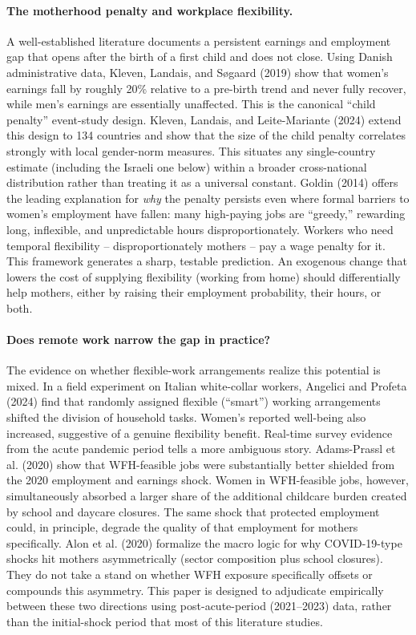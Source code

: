 \documentclass[11pt]{article}
\begin{document}
\paragraph{The motherhood penalty and workplace flexibility.} A well-established literature documents a persistent earnings and employment gap that opens after the birth of a first child and does not close. Using Danish administrative data, Kleven, Landais, and Søgaard (2019) show that women's earnings fall by roughly 20\% relative to a pre-birth trend and never fully recover, while men's earnings are essentially unaffected. This is the canonical ``child penalty'' event-study design. Kleven, Landais, and Leite-Mariante (2024) extend this design to 134 countries and show that the size of the child penalty correlates strongly with local gender-norm measures. This situates any single-country estimate (including the Israeli one below) within a broader cross-national distribution rather than treating it as a universal constant. Goldin (2014) offers the leading explanation for \emph{why} the penalty persists even where formal barriers to women's employment have fallen: many high-paying jobs are ``greedy,'' rewarding long, inflexible, and unpredictable hours disproportionately. Workers who need temporal flexibility -- disproportionately mothers -- pay a wage penalty for it. This framework generates a sharp, testable prediction. An exogenous change that lowers the cost of supplying flexibility (working from home) should differentially help mothers, either by raising their employment probability, their hours, or both.

\paragraph{Does remote work narrow the gap in practice?} The evidence on whether flexible-work arrangements realize this potential is mixed. In a field experiment on Italian white-collar workers, Angelici and Profeta (2024) find that randomly assigned flexible (``smart'') working arrangements shifted the division of household tasks. Women's reported well-being also increased, suggestive of a genuine flexibility benefit. Real-time survey evidence from the acute pandemic period tells a more ambiguous story. Adams-Prassl et al. (2020) show that WFH-feasible jobs were substantially better shielded from the 2020 employment and earnings shock. Women in WFH-feasible jobs, however, simultaneously absorbed a larger share of the additional childcare burden created by school and daycare closures. The same shock that protected employment could, in principle, degrade the quality of that employment for mothers specifically. Alon et al. (2020) formalize the macro logic for why COVID-19-type shocks hit mothers asymmetrically (sector composition plus school closures). They do not take a stand on whether WFH exposure specifically offsets or compounds this asymmetry. This paper is designed to adjudicate empirically between these two directions using post-acute-period (2021--2023) data, rather than the initial-shock period that most of this literature studies.
\end{document}
